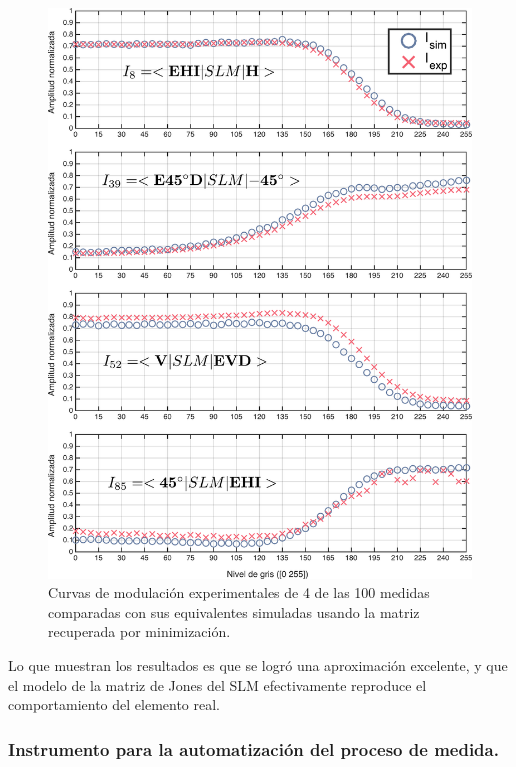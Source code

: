 \begin{figure}[h!]
\centering
\includegraphics[scale=.5]{some_caracterization_results.pdf}
\caption[Curvas de modulación experimentales comparadas con las
simuladas usando el modelo obtenido]{Curvas de modulación
  experimentales de 4 de las 100 medidas comparadas con sus
  equivalentes simuladas usando la matriz recuperada por minimización.}
\label{fig:some_caracterization_results}
\end{figure}
Lo que muestran los resultados es que se logró una aproximación
excelente, y que el modelo de la matriz de Jones del SLM efectivamente
reproduce el comportamiento del elemento real. 

\subsubsection{Instrumento para la automatización del proceso de medida.}

